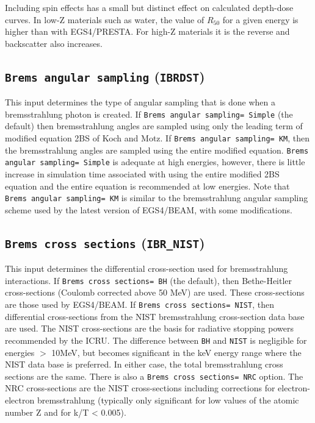 \documentclass[12pt,twoside]{article}
\begin{document}
Including spin effects has a small but distinct effect on calculated
depth-dose curves.  In low-Z materials such as water, the value of
$R_{50}$ for a given energy is higher than with EGS4/PRESTA. For high-Z
materials it is the reverse and backscatter also increases.

\subsection{ {\tt Brems angular sampling} ({\tt IBRDST})}
\label{bremssect}

This input determines the type of angular sampling that is done when
a bremsstrahlung photon is created.   If {\tt Brems angular sampling= Simple}
(the default) then bremsstrahlung angles are sampled using only the leading
term of modified equation 2BS of Koch and Motz\cite{Bi89,KM59}. If
{\tt Brems angular sampling= KM}, then the bremsstrahlung angles are sampled
using the entire modified equation.
{\tt Brems angular sampling= Simple} is adequate at high energies,
however, there is little increase in simulation time associated with using
the entire modified 2BS equation and the entire equation is recommended
at low energies.
Note that {\tt Brems angular sampling= KM} is similar to the bremsstrahlung
angular sampling scheme used by the latest version of EGS4/BEAM, with some
modifications.

\subsection{ {\tt Brems cross sections} ({\tt IBR\_NIST})}

This input determines the differential cross-section used for
bremsstrahlung interactions.  If {\tt Brems cross sections= BH} (the
default), then Bethe-Heitler cross-sections (Coulomb corrected above
50 MeV)\cite{KM59} are used.  These cross-sections are those used by
EGS4/BEAM.  If {\tt Brems cross sections= NIST}, then differential
cross-sections from the NIST bremsstrahlung cross-section data
base\cite{SB85,SB86a} are used.  The NIST cross-sections are the basis
for radiative stopping powers recommended by the ICRU\cite{ICRU37}.
The difference between {\tt BH} and {\tt NIST} is negligible for energies
$>$ 10MeV, but becomes significant in the keV energy range where the
NIST data base is preferred. In either case, the total bremsstrahlung
cross sections are the same.  There is also
a {\tt Brems cross sections= NRC} option.  The NRC cross-sections
are the NIST cross-sections including corrections for electron-electron
bremsstrahlung (typically only
significant for low values of the atomic number Z and for k/T < 0.005).
\end{document}
